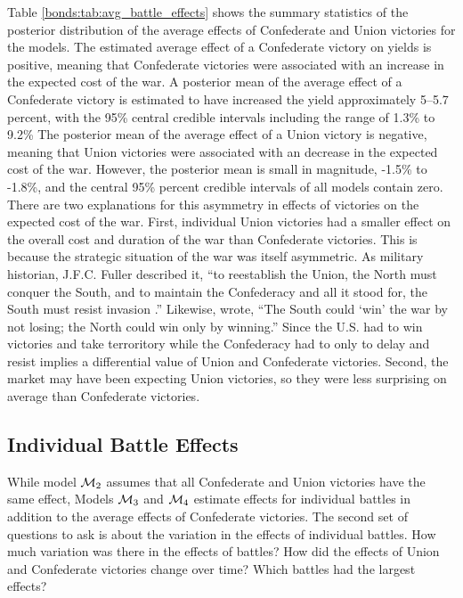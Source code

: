 Table \ref{bonds:tab:avg_battle_effects} shows the summary statistics of the posterior distribution of the average effects of Confederate and Union victories for the models.
The estimated average effect of a Confederate victory on yields is positive, meaning that Confederate victories were associated with an increase in the expected cost of the war.
A posterior mean of the average effect of a Confederate victory is estimated to have increased the yield approximately 5--5.7 percent, with the 95\% central credible intervals including the range of 1.3\% to 9.2\%
The posterior mean of the average effect of a Union victory is negative, meaning that Union victories were associated with an decrease in the expected cost of the war.
However, the posterior mean is small in magnitude, -1.5\% to -1.8\%, and the central 95\% percent credible intervals of all models contain zero.
There are two explanations for this asymmetry in effects of victories on the expected cost of the war.
First, individual Union victories had a smaller effect on the overall cost and duration of the war than Confederate victories.
This is because the strategic situation of the war was itself asymmetric. 
As military historian, J.F.C. Fuller described it, ``to reestablish the Union, the North must conquer the South, and to maintain the Confederacy and all it stood for, the South must resist invasion \parencite[177]{Fuller1942a}.'' 
Likewise, \textcite[336]{McPherson2003} wrote, ``The South could `win' the war by not losing; the North could win only by winning.''
Since the U.S. had to win victories and take terroritory while the Confederacy had to only to delay and resist implies a differential value of Union and Confederate victories.
Second, the market may have been expecting Union victories, so they were less surprising on average than Confederate victories.


\subsection{Individual Battle Effects}
\label{sec:indiv-effects-battl}

While model $\mathcal{M}_{\text{2}}$ assumes that all Confederate and Union victories have the same effect, Models $\mathcal{M}_{\text{3}}$ and $\mathcal{M}_{\text{4}}$ estimate effects for individual battles in addition to the average effects of Confederate victories.
The second set of questions to ask is about the variation in the effects of individual battles.
How much variation was there in the effects of battles? 
How did the  effects of Union and Confederate victories change over time?
Which battles had the largest effects? 

